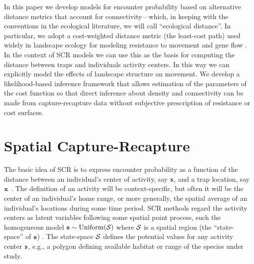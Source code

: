 \documentclass[12pt]{article}
\begin{document}
\begin{spacing}{1.8}
In this paper we develop models for encounter probability based on
alternative distance metrics that account for
connectivity---which, in keeping with the conventions in the
ecological literature, we will call ``ecological distance''. In
particular, we adopt a cost-weighted distance metric (the least-cost path)
used widely in landscape ecology for modeling resistance to movement
and gene flow \citep{adriaensen_etal:2003}. In the
context of SCR models we can use this as the basis for computing the
distance between traps and individuals activity centers. In this way
we can explicitly model the effects of %
landscape structure on movement.
We develop a likelihood-based inference framework that allows
estimation of the parameters of the cost function
so that direct inference about density and connectivity can be made
from capture-recapture data without subjective prescription
of resistance or cost surfaces.


\section{Spatial Capture-Recapture}

The basic idea of SCR is to express encounter probability %
as a function of the distance between an individual's center of
activity, say ${\bf s}$, and a trap location, say ${\bf x}$ \citep{borchers_efford:2008}. The
definition of an activity will be context-specific, but often it will
be the center of an individual's home range, or more generally, the
spatial average of an individual's locations during some time
period. SCR methods regard the activity centers as latent variables
following some spatial point process, such the homogeneous
model ${\bf s} \sim \mbox{Uniform}({\cal
  S})$ where ${\cal S}$ is a spatial region (the ``state-space'' of
${\bf s}$)
\citep{royle_young:2008}.
The state-space ${\cal S}$
defines the potential values for any activity center ${\bf s}$, e.g.,
a polygon defining available habitat or range of the species under study.


\end{spacing}
\end{document}
